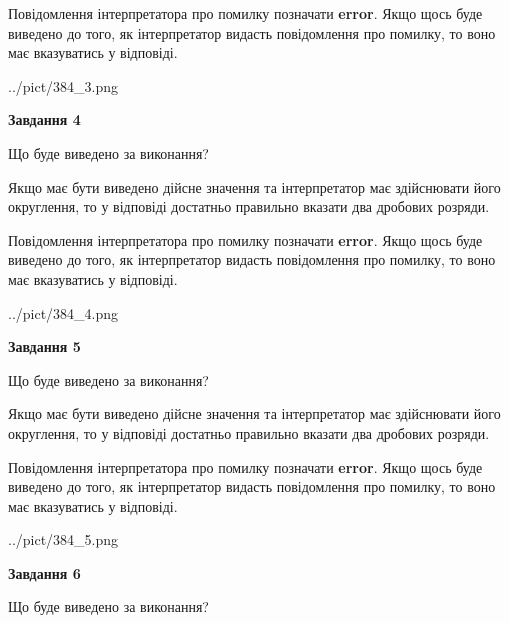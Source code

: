 \documentclass[12pt, ukrainian]{article}
\begin{document}
{\begin {Large}
Повідомлення інтерпретатора про помилку позначати \textbf{error}.
Якщо щось буде виведено до того, як інтерпретатор видасть повідомлення про помилку, 
то воно має вказуватись у відповіді. \par

\begin{center}
	{../pict/384_3.png}
\end{center}
\newpage

{\begin {center}\textbf{Завдання 4}\end {center}}\par
Що буде виведено за виконання? \par

Якщо має бути виведено дійсне значення та інтерпретатор має здійснювати його округлення, 
то у відповіді достатньо правильно вказати два дробових розряди.

Повідомлення інтерпретатора про помилку позначати \textbf{error}.
Якщо щось буде виведено до того, як інтерпретатор видасть повідомлення про помилку, 
то воно має вказуватись у відповіді. \par

\begin{center}
	{../pict/384_4.png}
\end{center}
\newpage

{\begin {center}\textbf{Завдання 5}\end {center}}\par
Що буде виведено за виконання? \par

Якщо має бути виведено дійсне значення та інтерпретатор має здійснювати його округлення, 
то у відповіді достатньо правильно вказати два дробових розряди.

Повідомлення інтерпретатора про помилку позначати \textbf{error}.
Якщо щось буде виведено до того, як інтерпретатор видасть повідомлення про помилку, 
то воно має вказуватись у відповіді. \par

\begin{center}
	{../pict/384_5.png}
\end{center}
\newpage

{\begin {center}\textbf{Завдання 6}\end {center}}\par
Що буде виведено за виконання? \par


\end{Large}}
\end{document}
